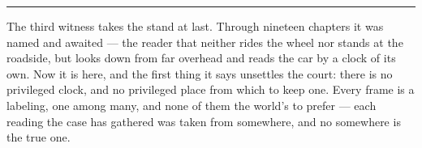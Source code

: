 %
%
%
%

\bigskip
\begin{center}
\rule{0.4\textwidth}{0.4pt}
\end{center}
\bigskip

\noindent The third witness takes the stand at last. Through nineteen chapters it was named and awaited --- the
reader that neither rides the wheel nor stands at the roadside, but looks down from far overhead and reads the
car by a clock of its own. Now it is here, and the first thing it says unsettles the court: there is no
privileged clock, and no privileged place from which to keep one. Every frame is a labeling, one among many, and
none of them the world's to prefer --- each reading the case has gathered was taken from somewhere, and no
somewhere is the true one.

